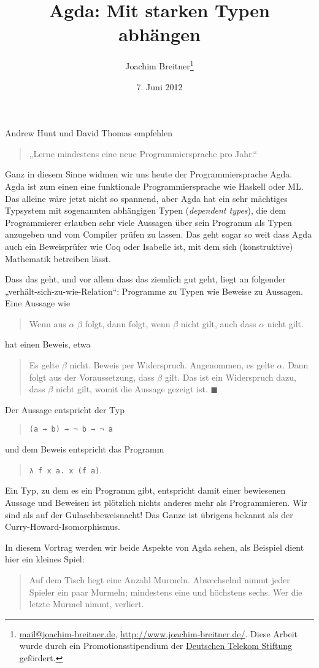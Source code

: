 \documentclass[12pt,parskip=half,headings=normal,abstract]{scrartcl}
\author{Joachim Breitner\footnote{\href{mailto:mail@joachim-breitner.de}{mail@joachim-breitner.de}, \url{http://www.joachim-breitner.de/}. Diese Arbeit wurde durch ein Promotionsstipendium der \href{http://telekom-stiftung.de/}{Deutschen Telekom Stiftung} gefördert.}}
\title{Agda: Mit starken Typen abhängen}
\date{7. Juni 2012}
\newcommand{\li}{\lstinline}
\begin{document}
\maketitle

Andrew Hunt und David Thomas empfehlen
\begin{quote}
„Lerne mindestens eine neue Programmiersprache pro Jahr.“
\end{quote}
Ganz in diesem Sinne widmen wir uns heute der Programmiersprache Agda. Agda ist zum einen eine funktionale Programmiersprache wie Haskell oder ML. Das alleine wäre jetzt nicht so spannend, aber Agda hat ein sehr mächtiges Typsystem mit sogenannten abhängigen Typen (\emph{dependent types}), die dem Programmierer erlauben sehr viele Aussagen über sein Programm als Typen anzugeben und vom Compiler prüfen zu lassen. Das geht sogar so weit dass Agda auch ein Beweisprüfer wie Coq oder Isabelle ist, mit dem sich (konstruktive) Mathematik betreiben lässt.

Dass das geht, und vor allem dass das ziemlich gut geht, liegt an folgender „verhält-sich-zu-wie-Relation“: Programme zu Typen wie Beweise zu Aussagen. Eine Aussage wie
\begin{quote}
Wenn aus $\alpha$ $\beta$ folgt, dann folgt,
wenn $\beta$ nicht gilt,  auch
dass $\alpha$ nicht gilt.
\end{quote}
hat einen Beweis, etwa
\begin{quote}
Es gelte $\beta$ nicht. Beweis per Widerspruch. Angenommen, es
gelte $\alpha$. Dann folgt aus der Voraussetzung, dass $\beta$ gilt.
Das ist ein Widerspruch dazu, dass $\beta$ nicht
gilt, womit die Aussage gezeigt ist.
$\blacksquare$
\end{quote}
Der Aussage entspricht der Typ
\begin{quote}
\li!(a → b) → ¬ b → ¬ a!
\end{quote}
und dem Beweis entspricht das Programm
\begin{quote}
\li!λ f x a. x (f a)!.
\end{quote}
Ein Typ, zu dem es ein Programm gibt, entspricht damit einer bewiesenen Aussage und Beweisen ist plötzlich nichts anderes mehr als Programmieren. Wir sind als auf der Gulaschbeweisnacht!  Das Ganze ist übrigens bekannt als der Curry-Howard-Isomorphismus.

In diesem Vortrag werden wir beide Aspekte von Agda sehen, als Beispiel dient hier ein kleines Spiel:

\begin{quote}
Auf dem Tisch liegt eine Anzahl Murmeln. Abwechselnd nimmt jeder Spieler ein paar Murmeln; mindestens eine und höchstens sechs. Wer die letzte Murmel nimmt, verliert.
\end{quote}





\appendix

\end{document}
